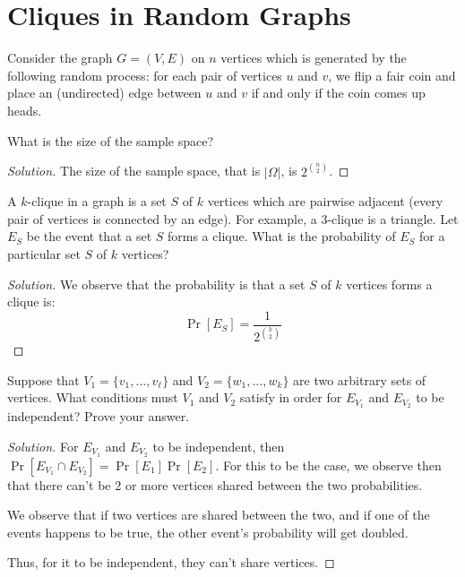 \documentclass{article}
\newenvironment{solution}{\begin{proof}[Solution]}{\end{proof}}
\begin{document}
\newpage

\section{Cliques in Random Graphs}
Consider the graph $G = (V,E)$ on $n$ vertices which is generated by the following random process: for each pair of vertices $u$ and $v$, we flip a fair coin and place an (undirected) edge between $u$ and $v$ if and only if the coin comes up heads.

\begin{hw}
	What is the size of the sample space?
\end{hw}
\begin{solution}
	The size of the sample space, that is $\lvert \Omega \rvert$, is $2^{\binom{n}{2}}$.
\end{solution}

\begin{hw}
	A $k$-clique in a graph is a set $S$ of $k$ vertices which are pairwise adjacent (every pair of vertices is connected by an edge). For example, a $3$-clique is a triangle. Let $E_S$ be the event that a set $S$ forms a clique. What is the probability of $E_S$ for a particular set $S$ of $k$ vertices? 
\end{hw}
\begin{solution}
	We observe that the probability is that a set $S$ of $k$ vertices forms a clique is:
	\begin{equation*}
		\Pr[E_{S}] = \frac{1}{2^{\binom{k}{2}}}
	\end{equation*}
\end{solution}

\begin{hw}
	Suppose that $V_1 = \{v_1, \dots, v_{\ell}\}$ and $V_2 = \{w_1, \dots, w_k\}$ are two arbitrary sets of vertices. What conditions must $V_1$ and $V_2$ satisfy in order for $E_{V_1}$ and $E_{V_2}$ to be independent? Prove your answer.
\end{hw}
\begin{solution}
	For $E_{V_{1}}$ and $E_{V_{2}}$ to be independent, then $\Pr[E_{V_{1}} \cap E_{V_{2}}] = \Pr[E_{1}]\Pr[E_{2}]$. For this to be the case, we observe then that there can't be $2$ or more vertices shared between the two probabilities.
	
	We observe that if two vertices are shared between the two, and if one of the events happens to be true, the other event's probability will get doubled.
	
	Thus, for it to be independent, they can't share vertices.
\end{solution}
\end{document}
